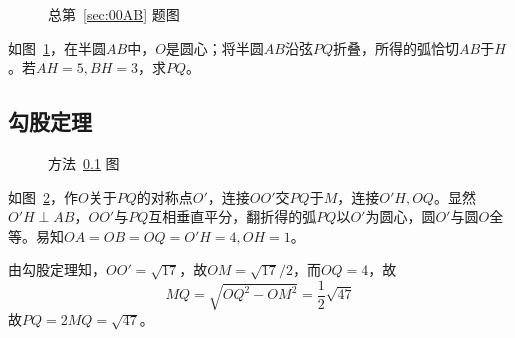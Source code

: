 

\begin{figure}[htbp]
  \centering {}
  \caption{总第~\ref{sec:00AB} 题图} \label{fig:00AB}
\end{figure}

如图~\ref{fig:00AB}，在半圆$AB$中，$O$是圆心；将半圆$AB$沿弦$PQ$折叠，所得的弧恰切$AB$于$H$。若$AH = 5, BH = 3$，求$PQ$。


\subsection{勾股定理} \label{subsec:00AB-sym}

\begin{figure}[htbp]
  \centering {}
  \caption{方法~\ref{subsec:00AB-sym} 图} \label{fig:00AB-sym}
\end{figure}

如图~\ref{fig:00AB-sym}，作$O$关于$PQ$的对称点$O'$，连接$OO'$交$PQ$于$M$，连接$O'H, OQ$。显然$O'H \perp AB$，$OO'$与$PQ$互相垂直平分，翻折得的弧$PQ$以$O'$为圆心，圆$O'$与圆$O$全等。易知$OA = OB = OQ = O'H = 4, OH = 1$。

由勾股定理知，$OO' = \sqrt{17}$，故$OM = \sqrt{17}/2$，而$OQ = 4$，故
\[ MQ = \sqrt{OQ^2 - OM^2} = \frac12\sqrt{47} \]
故$PQ = 2MQ = \sqrt{47}$。
